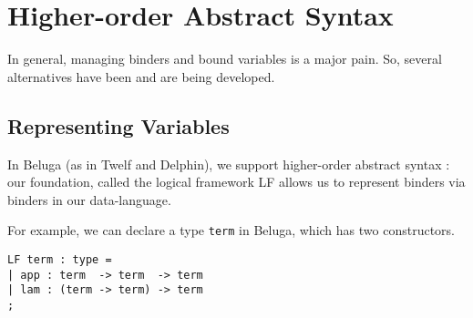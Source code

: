 




\section{Higher-order Abstract Syntax}\label{sec:HOAS}
In general, managing binders and bound variables is a major pain. So,
several alternatives have been and are being developed.

\subsection{Representing Variables}\label{sec:HOAS-var}
In Beluga (as in Twelf and Delphin), we support higher-order abstract
syntax : our foundation, called the logical framework LF
\citep{Harper93jacm} allows us to represent binders via binders in our
data-language.

For example, we can declare a type \lstinline!term! in Beluga,
which has two constructors.

\begin{lstlisting}
LF term : type =
| app : term  -> term  -> term
| lam : (term -> term) -> term
;
\end{lstlisting}

